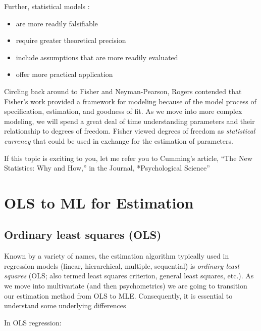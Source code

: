 \documentclass[
  11pt,
]{book}
\providecommand{\tightlist}{%
  \setlength{\itemsep}{0pt}\setlength{\parskip}{0pt}}
\begin{document}
Further, statistical models \citep{rodgers_epistemology_2010}:

\begin{itemize}
\tightlist
\item
  are more readily falsifiable
\item
  require greater theoretical precision
\item
  include assumptions that are more readily evaluated
\item
  offer more practical application
\end{itemize}

Circling back around to Fisher and Neyman-Pearson, Rogers \citeyearpar{rodgers_epistemology_2010} contended that Fisher's work provided a framework for modeling because of the model process of specification, estimation, and goodness of fit. As we move into more complex modeling, we will spend a great deal of time understanding parameters and their relationship to degrees of freedom. Fisher viewed degrees of freedom as \emph{statistical currency} that could be used in exchange for the estimation of parameters.

If this topic is exciting to you, let me refer you to Cumming's \citep{cumming_new_2014} article, ``The New Statistics: Why and How,'' in the Journal, *Psychological Science''

\hypertarget{ols-to-ml-for-estimation}{%
\section{OLS to ML for Estimation}\label{ols-to-ml-for-estimation}}

\hypertarget{ordinary-least-squares-ols}{%
\subsection{Ordinary least squares (OLS)}\label{ordinary-least-squares-ols}}

Known by a variety of names, the estimation algorithm typically used in regression models (linear, hierarchical, multiple, sequential) is \emph{ordinary least squares} (OLS; also termed least squares criterion, general least squares, etc.). As we move into multivariate (and then psychometrics) we are going to transition our estimation method from OLS to MLE. Consequently, it is essential to understand some underlying differences \citep{cohen_applied_2003, myung_tutorial_2003}

In OLS regression:
\end{document}
